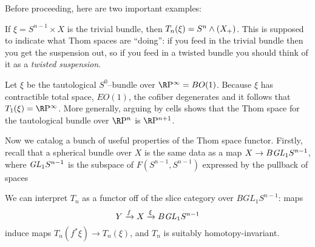 Before proceeding, here are two important examples:
\begin{example}\label{TrivialBundleThomExample}
If $\xi = S^{n-1} \times X$ is the trivial bundle, then $T_n(\xi) = S^n \wedge (X_+)$.  This is supposed to indicate what Thom spaces are ``doing'': if you feed in the trivial bundle then you get the suspension out, so if you feed in a twisted bundle you should think of it as a \textit{twisted suspension}.
\end{example}

\begin{example}\label{RPnThomExample}
Let $\xi$ be the tautological $S^0$--bundle over $\RP^\infty = BO(1)$.  Because $\xi$ has contractible total space, $EO(1)$, the cofiber degenerates and it follows that $T_1(\xi) = \RP^\infty$. More generally, arguing by cells shows that the Thom space for the tautological bundle over $\RP^n$ is $\RP^{n+1}$.
\end{example}

Now we catalog a bunch of useful properties of the Thom space functor.  Firstly, recall that a spherical bundle over $X$ is the same data as a map $X \to B \mathit{GL}_1 S^{n-1}$, where $\mathit{GL}_1 S^{n-1}$ is the subspace of $F(S^{n-1}, S^{n-1})$ expressed by the pullback of spaces
\begin{center}
\end{center}
We can interpret $T_n$ as a functor off of the slice category over $BGL_1 S^{n-1}$: maps \[Y \xrightarrow{f} X \xrightarrow{\xi} B \mathit{GL}_1 S^{n-1}\] induce maps $T_n(f^* \xi) \to T_n(\xi)$, and $T_n$ is suitably homotopy-invariant.

